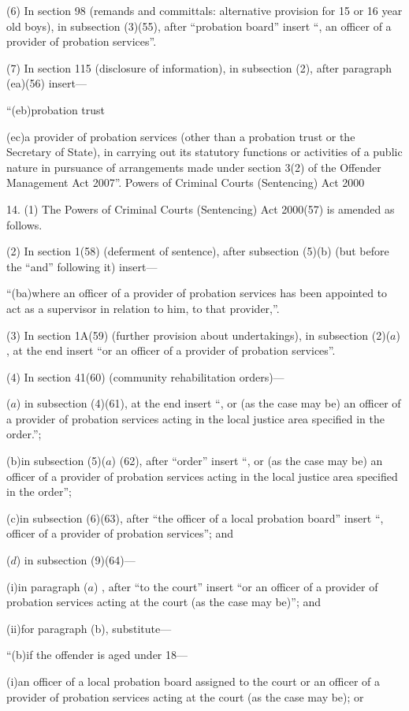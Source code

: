 \documentclass[12pt,a4paper]{article}
\begin{document}
(6) In section 98 (remands and committals: alternative provision for 15 or 16 year old boys), in subsection (3)(55), after “probation board” insert “, an officer of a provider of probation services”.

(7) In section 115 (disclosure of information), in subsection (2), after paragraph (ea)(56) insert—

“(eb)probation trust

(ec)a provider of probation services (other than a probation trust or the Secretary of State), in carrying out its statutory functions or activities of a public nature in pursuance of arrangements made under section 3(2) of the Offender Management Act 2007”.
Powers of Criminal Courts (Sentencing) Act 2000

14.  (1)  The Powers of Criminal Courts (Sentencing) Act 2000(57) is amended as follows.

(2) In section 1(58) (deferment of sentence), after subsection (5)(b) (but before the “and” following it) insert—

“(ba)where an officer of a provider of probation services has been appointed to act as a supervisor in relation to him, to that provider,”.

(3) In section 1A(59) (further provision about undertakings), in subsection (2)($a$) , at the end insert “or an officer of a provider of probation services”.

(4) In section 41(60) (community rehabilitation orders)—

($a$) in subsection (4)(61), at the end insert “, or (as the case may be) an officer of a provider of probation services acting in the local justice area specified in the order.”;

(b)in subsection (5)($a$) (62), after “order” insert “, or (as the case may be) an officer of a provider of probation services acting in the local justice area specified in the order”;

(c)in subsection (6)(63), after “the officer of a local probation board” insert “, officer of a provider of probation services”; and

($d$) in subsection (9)(64)—

(i)in paragraph ($a$) , after “to the court” insert “or an officer of a provider of probation services acting at the court (as the case may be)”; and

(ii)for paragraph (b), substitute—

“(b)if the offender is aged under 18—

(i)an officer of a local probation board assigned to the court or an officer of a provider of probation services acting at the court (as the case may be); or
\end{document}
